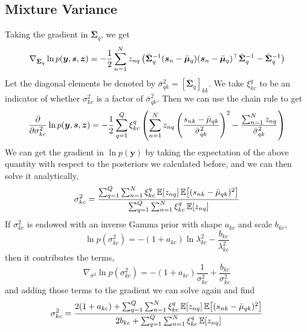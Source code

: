 \documentclass{article}
\newcommand{\source}{s}
\newcommand{\sourcevec}{\bm{\source}}
\newcommand{\obs}{y}
\newcommand{\obsvec}{\bm{\obs}}
\newcommand{\mean}{\mu}
\newcommand{\meanvec}{\bm{\mean}}
\newcommand{\scale}{\sigma}
\newcommand{\scalesq}{\scale^2}
\newcommand{\assign}{z}
\newcommand{\assignvec}{\bm{\assign}}
\newcommand{\compmean}{\bar{\mean}}
\newcommand{\compmeanvec}{\bar{\meanvec}}
\newcommand{\compcov}{\bar{\bm{\Sigma}}}
\newcommand{\compscalesq}{\bar{{\scale}}^2}
\newcommand{\noisescalesq}{\lambda^2}
\begin{document}
\subsection{Mixture Variance}
Taking the gradient in $\compcov_q$, we get
\begin{equation}
\nabla_{\compcov_q}\ln p(\obsvec,\sourcevec,\assignvec)=-\frac{1}{2}\sum_{n=1}^{N}\assign_{nq}\left(\compcov_q^{-1}(\sourcevec_n-\compmeanvec_q)(\sourcevec_n-\compmeanvec_q)\T\compcov_q^{-1}-\compcov^{-1}_q\right)
\end{equation}
Let the diagonal elements be denoted by $\compscalesq_{qk}=[\compcov_q]_{kk}$.
We take $\xi_{kc}^q$ to be an indicator of whether $\scalesq_{kc}$ is a factor of $\compscalesq_{qk}$. Then we can use the chain rule to get
\begin{equation}
\pdv{\scalesq_{kc}}\ln p(\obsvec,\sourcevec,\assignvec)=-\frac{1}{2}\sum_{q=1}^{Q}\xi_{kc}^{q}\left(\sum_{n=1}^{N}\assign_{nq}\left(\frac{\source_{nk}-\compmean_{qk}}{\compscalesq_{qk}}\right)^2-\frac{\sum_{n=1}^{N}\assign_{nq}}{\compscalesq_{qk}}\right)
\end{equation}
We can get the gradient in $\ln p(\obsvec)$ by taking the expectation of the above quantity with respect to the posteriors we calculated before, and we can then solve it analytically,
\begin{equation}
\scalesq_{kc} =\frac{\sum_{q=1}^{Q}\sum_{n=1}^{N}\xi_{kc}^q\E{\assign_{nq}}\E{(\source_{nk}-\compmean_{qk})^2}}{\sum_{q=1}^{Q}\sum_{n=1}^{N}\xi_{kc}^q\E{\assign_{nq}}}
\end{equation}
If $\scalesq_{kc}$ is endowed with an inverse Gamma prior with shape $a_{kc}$ and scale $b_{kc}$,
\begin{equation}
\ln p(\scalesq_{kc})=-(1+a_{kc})\ln\noisescalesq_{kc}-\frac{b_{kc}}{\noisescalesq_{kc}}
\end{equation}
then it contributes the terms,
\begin{equation}
\nabla_{\scalesq}\ln p(\scalesq_{kc})=-(1+a_{kc})\frac{1}{\scalesq_{kc}}+\frac{b_{kc}}{\scalesq_{kc}}
\end{equation}
and adding those terms to the gradient we can solve again and find
\begin{equation}
\scalesq_{kc} =\frac{2(1+a_{kc})+\sum_{q=1}^{Q}\sum_{n=1}^{N}\xi_{kc}^q\E{\assign_{nq}}\E{(\source_{nk}-\compmean_{qk})^2}}{2b_{kc}+\sum_{q=1}^{Q}\sum_{n=1}^{N}\xi_{kc}^q\E{\assign_{nq}}}
\end{equation}
\end{document}
